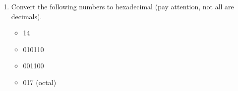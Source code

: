 \documentclass[letter,11pt]{article}
\begin{document}
\begin{enumerate}
\begin{verbatim}
heightCounter = 0;
while (heightCounter < height) {
   widthCounter = 0;
   while (widthCounter < width) {
      printf("*");
      widthCounter = widthCounter + 1;
      totalStars = totalStars + 1;
   }
   printf("\n");
   heightCounter = heightCounter + 1;
}
    \end{verbatim}
    
    \item Convert the following numbers to hexadecimal (pay attention, not all are decimals).
    \begin{itemize}
        \item 14
        \item 010110
        \item 001100
        \item 017 (octal)
    \end{itemize}
\end{enumerate}
\end{document}
